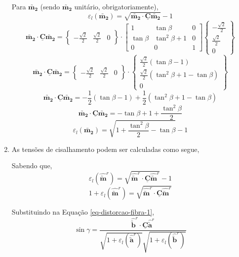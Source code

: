 \begin{enumerate}
    Para $\utilde{\mathbf{m_2}}$ (sendo $\utilde{\mathbf{m_2}}$ unitário, obrigatoriamente),
    \[\varepsilon_l(\utilde{\mathbf{m_2}})=\sqrt{\utilde{\mathbf{m_2}}\cdot\underline{\mathbf{C}}\utilde{\mathbf{m_2}}}-1\]
    \[
        \utilde{\mathbf{m_2}}\cdot\underline{\mathbf{C}}\utilde{\mathbf{m_2}}
        =
        \begin{Bmatrix}
            -\frac{\sqrt{2}}{2} & \frac{\sqrt{2}}{2} & 0
        \end{Bmatrix}
        \cdot
        \begin{bmatrix}
            1 & \tan\beta & 0 \\
            \tan\beta & \tan^2\beta + 1 & 0 \\
            0 & 0 & 1
        \end{bmatrix}
        \begin{Bmatrix}
            -\frac{\sqrt{2}}{2} \\ \frac{\sqrt{2}}{2} \\ 0
        \end{Bmatrix}
    \]
    \[
        \utilde{\mathbf{m_2}}\cdot\underline{\mathbf{C}}\utilde{\mathbf{m_2}}
        =
        \begin{Bmatrix}
            -\frac{\sqrt{2}}{2} & \frac{\sqrt{2}}{2} & 0
        \end{Bmatrix}
        \cdot
        \begin{Bmatrix}
            \frac{\sqrt{2}}{2}(\tan\beta-1) \\ \frac{\sqrt{2}}{2}(\tan^2\beta+1-\tan\beta) \\ 0
        \end{Bmatrix}
    \]
    \[\utilde{\mathbf{m_2}}\cdot\underline{\mathbf{C}}\utilde{\mathbf{m_2}}=-\frac{1}{2}(\tan\beta-1)+\frac{1}{2}(\tan^2\beta+1-\tan\beta)\]
    \[\utilde{\mathbf{m_2}}\cdot\underline{\mathbf{C}}\utilde{\mathbf{m_2}}=-\tan\beta+1+\frac{\tan^2\beta}{2}\]
    \[\varepsilon_l(\utilde{\mathbf{m_2}})=\sqrt{1+\frac{\tan^2\beta}{2}-\tan\beta}-1\]

    \item As tensões de cisalhamento podem ser calculadas como segue,
    
    Sabendo que,
    \[\varepsilon_l(\hat{\utilde{\mathbf{m}}}^r)=\sqrt{\hat{\utilde{\mathbf{m}}}^r\cdot\underline{\mathbf{C}}\hat{\utilde{\mathbf{m}}}^r}-1\]
    \[1+\varepsilon_l(\hat{\utilde{\mathbf{m}}}^r)=\sqrt{\hat{\utilde{\mathbf{m}}}^r\cdot\underline{\mathbf{C}}\hat{\utilde{\mathbf{m}}}^r}\]
    
    Substituindo na Equação \eqref{eq-distorcao-fibra-1},
    \[
        \sin\gamma=\frac{\hat{\utilde{\mathbf{b}}}^r\cdot\underline{\mathbf{C}}\hat{\utilde{\mathbf{a}}}^r}{\sqrt{1+\varepsilon_l(\hat{\utilde{\mathbf{a}}}^r)}\sqrt{1+\varepsilon_l(\hat{\utilde{\mathbf{b}}}^r)}}		
    \]
    

\end{enumerate}
